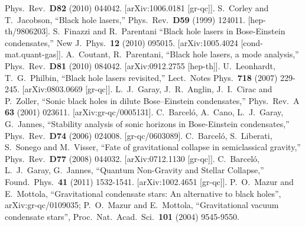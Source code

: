 \documentclass[11pt,a4paper]{article}
\begin{document}
\begin{thebibliography}{666}
  Phys.\ Rev.\  {\bf D82 } (2010) 044042.
  [arXiv:1006.0181 [gr-qc]].
S.~Corley and T.~Jacobson,
``Black hole lasers,''
  Phys.\ Rev.\  {\bf D59 } (1999)  124011.
  [hep-th/9806203].
S.~Finazzi and R.~Parentani
``Black hole lasers in Bose-Einstein condensates,''
  New J.\ Phys.\  {\bf 12 } (2010)  095015.
  [arXiv:1005.4024 [cond-mat.quant-gas]].
  A.~Coutant, R.~Parentani,
  ``Black hole lasers, a mode analysis,''
  Phys.\ Rev.\  {\bf D81 } (2010) 084042. 
  [arXiv:0912.2755 [hep-th]].
  U.~Leonhardt, T.~G.~Philbin,
  ``Black hole lasers revisited,''
  Lect.\ Notes Phys.\  {\bf 718 } (2007) 229-245.
[arXiv:0803.0669 [gr-qc]].
  L.~J.~Garay, J.~R.~Anglin, J.~I.~Cirac and P.~Zoller,
  ``Sonic black holes in dilute Bose--Einstein condensates,''
  Phys.\ Rev.\  A {\bf 63 }  (2001) 023611.
  [arXiv:gr-qc/0005131].
  C.~Barcel\'o, A.~Cano, L.~J.~Garay, G.~Jannes,
  ``Stability analysis of sonic horizons in Bose-Einstein condensates,''
  Phys.\ Rev.\  {\bf D74 } (2006)  024008.
  [gr-qc/0603089].
  C.~Barcel\'o, S.~Liberati, S.~Sonego and M.~Visser,
  ``Fate of gravitational collapse in semiclassical gravity,''
  Phys.\ Rev.\  {\bf D77 } (2008)  044032.
  [arXiv:0712.1130 [gr-qc]].
  C.~Barcel\'o, L.~J.~Garay, G.~Jannes,
  ``Quantum Non-Gravity and Stellar Collapse,''
  Found.\ Phys.\  {\bf 41 } (2011) 1532-1541.
  [arXiv:1002.4651 [gr-qc]].
P.~O.~Mazur and E.~Mottola,
``Gravitational condensate stars: An alternative to black holes'',
arXiv:gr-qc/0109035;
P.~O.~Mazur and E.~Mottola,
``Gravitational vacuum condensate stars'',
  Proc.\ Nat.\ Acad.\ Sci.\  {\bf 101 } (2004)  9545-9550.

\end{thebibliography}
\end{document}
